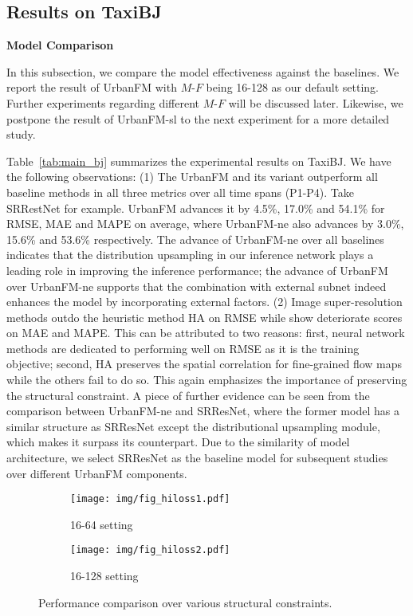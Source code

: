 \subsection{Results on TaxiBJ}
\noindent\textbf{Model Comparison}

\noindent In this subsection, we compare the model effectiveness against the baselines. We report the result of UrbanFM with $M$-$F$ being 16-128 as our default setting. Further experiments regarding different $M$-$F$ will be discussed later. Likewise, we postpone the result of UrbanFM-sl to the next experiment for a more detailed study.

Table~\ref{tab:main_bj} summarizes the experimental results on TaxiBJ. We have the following observations: (1) The UrbanFM and its variant outperform all baseline methods in all three metrics over all time spans (P1-P4). Take SRRestNet for example. UrbanFM advances it by 4.5\%, 17.0\% and 54.1\% for RMSE, MAE and MAPE on average, where UrbanFM-ne also advances by 3.0\%, 15.6\% and 53.6\% respectively. The advance of UrbanFM-ne over all baselines indicates that the distribution upsampling in our inference network plays a leading role in improving the inference performance; the advance of UrbanFM over UrbanFM-ne supports that the combination with external subnet indeed enhances the model by incorporating external factors. (2) Image super-resolution methods outdo the heuristic method HA on RMSE while show deteriorate scores on MAE and MAPE. This can be attributed to two reasons: first, neural network methods are dedicated to performing well on RMSE as it is the training objective; second, HA preserves the spatial correlation for fine-grained flow maps while the others fail to do so. This again emphasizes the importance of preserving the structural constraint. A piece of further evidence can be seen from the comparison between UrbanFM-ne and SRResNet, where the former model has a similar structure as SRResNet except the distributional upsampling module, which makes it surpass its counterpart. Due to the similarity of model architecture, we select SRResNet as the baseline model for subsequent studies over different UrbanFM components.

\begin{figure}[!b]
	\centering
	\vspace{-1em}
	\begin{subfigure}[b]{0.23\textwidth}
		\texttt{[image: img/fig\_hiloss1.pdf]}
		\caption{16-64 setting}
		\label{fig:hiloss1}
	\end{subfigure}
	\begin{subfigure}[b]{0.23\textwidth}
		\texttt{[image: img/fig\_hiloss2.pdf]}
		\caption{16-128 setting}
		\label{fig:hiloss2}
	\end{subfigure}
	\vspace{-1em}
	\caption{Performance comparison over various structural constraints.}
	\label{fig:hiloss}
\end{figure}



